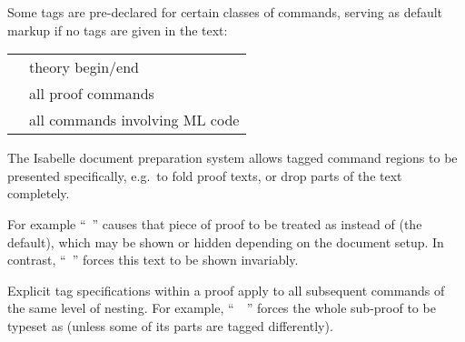 \begin{isabellebody}
\begin{isamarkuptext}
  Some tags are pre-declared for certain classes of commands, serving
  as default markup if no tags are given in the text:

  \medskip
  \begin{tabular}{ll}
    \isa{{\isaliteral{22}{\isachardoublequote}}theory{\isaliteral{22}{\isachardoublequote}}} & theory begin/end \\
    \isa{{\isaliteral{22}{\isachardoublequote}}proof{\isaliteral{22}{\isachardoublequote}}} & all proof commands \\
    \isa{{\isaliteral{22}{\isachardoublequote}}ML{\isaliteral{22}{\isachardoublequote}}} & all commands involving ML code \\
  \end{tabular}

  \medskip The Isabelle document preparation system
  \cite{isabelle-sys} allows tagged command regions to be presented
  specifically, e.g.\ to fold proof texts, or drop parts of the text
  completely.

  For example ``\hyperlink{command.by}{\mbox{}}~'' causes
  that piece of proof to be treated as  instead of
   (the default), which may be shown or hidden
  depending on the document setup.  In contrast, ``\hyperlink{command.by}{\mbox{}}~'' forces this text to be shown
  invariably.

  Explicit tag specifications within a proof apply to all subsequent
  commands of the same level of nesting.  For example, ``\hyperlink{command.proof}{\mbox{}}~~\hyperlink{command.qed}{\mbox{}}'' forces the whole
  sub-proof to be typeset as  (unless some of its parts
  are tagged differently).


\end{isamarkuptext}
\end{isabellebody}

